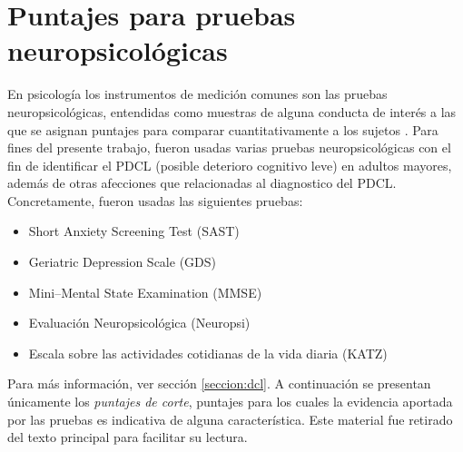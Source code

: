 
\chapter{Puntajes para pruebas neuropsicológicas}
\label{apendice_pruebas}


En psicología los instrumentos de medición comunes son las pruebas neuropsicológicas, entendidas como muestras de alguna conducta de interés a las que se asignan puntajes para comparar cuantitativamente a los sujetos \cite{Ardila12}. 
%
%
Para fines del presente trabajo, fueron usadas varias pruebas neuropsicológicas con el fin de identificar el PDCL (posible deterioro cognitivo leve) en adultos mayores, además de otras afecciones que relacionadas al diagnostico del PDCL.
%
Concretamente, fueron usadas las siguientes pruebas:
\begin{itemize}
\item {Short Anxiety Screening Test (SAST)} 
\item {Geriatric Depression Scale (GDS)}
\item {Mini--Mental State Examination (MMSE)}
\item {Evaluación Neuropsicológica (Neuropsi)}
\item {Escala sobre las actividades cotidianas de la vida diaria (KATZ)}
\end{itemize}

Para más información, ver sección \ref{seccion:dcl}.
%
A continuación se presentan únicamente los \textit{puntajes de corte}, puntajes para los cuales la evidencia aportada por las pruebas es indicativa de alguna característica.
%
Este material fue retirado del texto principal para facilitar su lectura.

